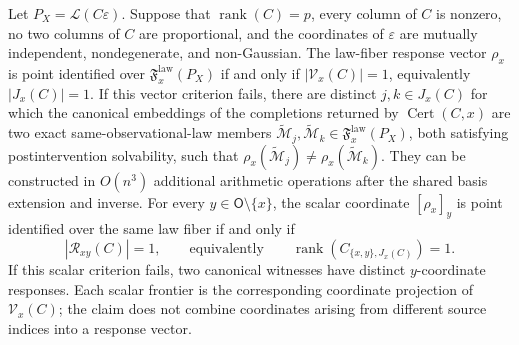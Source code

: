 Let \(P_X=\mathcal L(C\varepsilon)\). Suppose that \(\operatorname{rank}(C)=p\), every column of \(C\) is nonzero, no two columns of \(C\) are proportional, and the coordinates of \(\varepsilon\) are mutually independent, nondegenerate, and non-Gaussian. The law-fiber response vector \(\rho_x\) is point identified over \(\mathfrak F_x^{\mathrm{law}}(P_X)\) if and only if \(|\mathcal V_x(C)|=1\), equivalently \(|J_x(C)|=1\). If this vector criterion fails, there are distinct \(j,k\in J_x(C)\) for which the canonical embeddings of the completions returned by \(\operatorname{Cert}(C,x)\) are two exact same-observational-law members \(\widetilde{\mathcal M}_j,\widetilde{\mathcal M}_k\in\mathfrak F_x^{\mathrm{law}}(P_X)\), both satisfying postintervention solvability, such that \(\rho_x(\widetilde{\mathcal M}_j)\ne\rho_x(\widetilde{\mathcal M}_k)\). They can be constructed in \(O(n^3)\) additional arithmetic operations after the shared basis extension and inverse. For every \(y\in\mathsf O\setminus\{x\}\), the scalar coordinate \([\rho_x]_y\) is point identified over the same law fiber if and only if
\[
 |\mathcal R_{xy}(C)|=1,
 \qquad\text{equivalently}\qquad
 \operatorname{rank}\!\left(C_{\{x,y\},J_x(C)}\right)=1.
\]
If this scalar criterion fails, two canonical witnesses have distinct \(y\)-coordinate responses. Each scalar frontier is the corresponding coordinate projection of \(\mathcal V_x(C)\); the claim does not combine coordinates arising from different source indices into a response vector.